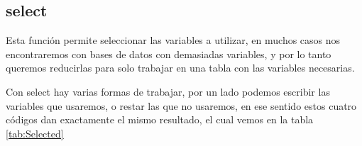 \documentclass[]{book}
\newenvironment{Shaded}{\begin{snugshade}}{\end{snugshade}}
\newcommand{\KeywordTok}[1]{\textcolor[rgb]{0.13,0.29,0.53}{\textbf{#1}}}
\newcommand{\NormalTok}[1]{#1}
\newcommand{\OperatorTok}[1]{\textcolor[rgb]{0.81,0.36,0.00}{\textbf{#1}}}
\newcommand{\StringTok}[1]{\textcolor[rgb]{0.31,0.60,0.02}{#1}}
\begin{document}
\hypertarget{select}{%
\subsection{select}\label{select}}

Esta función permite seleccionar las variables a utilizar, en muchos
casos nos encontraremos con bases de datos con demasiadas variables, y
por lo tanto queremos reducirlas para solo trabajar en una tabla con las
variables necesarias.

Con select hay varias formas de trabajar, por un lado podemos escribir
las variables que usaremos, o restar las que no usaremos, en ese sentido
estos cuatro códigos dan exactamente el mismo resultado, el cual vemos
en la tabla \ref{tab:Selected}

\begin{Shaded}
\end{Shaded}

\begin{Shaded}
\end{Shaded}

\begin{Shaded}
\end{Shaded}

\begin{Shaded}
\end{Shaded}
\end{document}
